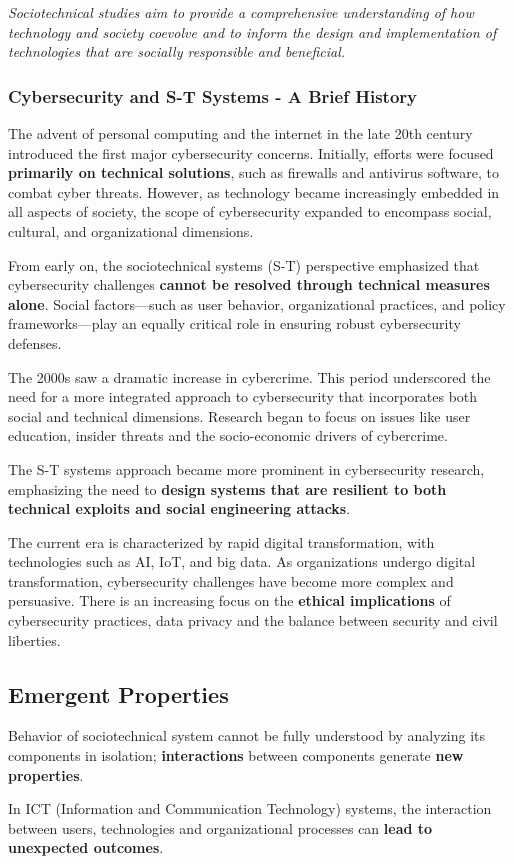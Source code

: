 \begin{center}
    \textit{Sociotechnical studies aim to provide a comprehensive understanding of how technology and society coevolve and to inform the design and implementation of technologies that are socially responsible and beneficial.}
\end{center}

\subsubsection*{Cybersecurity and S-T Systems - A Brief History}
The advent of personal computing and the internet in the late 20th century introduced the first major cybersecurity concerns. Initially, efforts were focused \textbf{primarily on technical solutions}, such as firewalls and antivirus software, to combat cyber threats. However, as technology became increasingly embedded in all aspects of society, the scope of cybersecurity expanded to encompass social, cultural, and organizational dimensions.

\vspace{0.5cm}

From early on, the sociotechnical systems (S-T) perspective emphasized that cybersecurity challenges \textbf{cannot be resolved through technical measures alone}. Social factors—such as user behavior, organizational practices, and policy frameworks—play an equally critical role in ensuring robust cybersecurity defenses.

\vspace{0.5cm}

The 2000s saw a dramatic increase in cybercrime. This period underscored the need for a more integrated approach to cybersecurity that incorporates both social and technical dimensions. Research began to focus on issues like user education, insider threats and the socio-economic drivers of cybercrime.

The S-T systems approach became more prominent in cybersecurity research, emphasizing the need to \textbf{design systems that are resilient to both technical exploits and social engineering attacks}.

\vspace{0.5cm}

The current era is characterized by rapid digital transformation, with technologies such as AI, IoT, and big data. As organizations undergo digital transformation, cybersecurity challenges have become more complex and persuasive. There is an increasing focus on the \textbf{ethical implications} of cybersecurity practices, data privacy and the balance between security and civil liberties.

\subsection{Emergent Properties}
Behavior of  sociotechnical system cannot be fully understood by analyzing its components in isolation; \textbf{interactions} between components generate \textbf{new properties}.

In ICT (Information and Communication Technology) systems, the interaction between users, technologies and organizational processes can \textbf{lead to unexpected outcomes}. 
